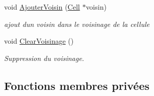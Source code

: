 \begin{DoxyCompactItemize}
void \mbox{\hyperlink{class_cell_aef5912d85e2ca3e034023fb0874896fa}{Ajouter\+Voisin}} (\mbox{\hyperlink{class_cell}{Cell}} $\ast$voisin)
\begin{DoxyCompactList}\small\item\em ajout d\textquotesingle{}un voisin dans le voisinage de la cellule \end{DoxyCompactList}\item 
void \mbox{\hyperlink{class_cell_a4f07be87bb04bdc457726c51f2c69bcc}{Clear\+Voisinage}} ()
\begin{DoxyCompactList}\small\item\em Suppression du voisinage. \end{DoxyCompactList}\end{DoxyCompactItemize}
\subsection*{Fonctions membres privées}

